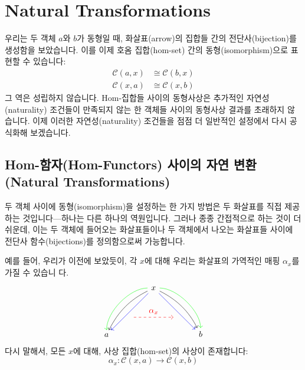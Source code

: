 \documentclass[DaoFP]{subfiles}
\begin{document}
\setcounter{chapter}{8}

\chapter{Natural Transformations}

우리는 두 객체 $a$와 $b$가 동형일 때, 화살표(arrow)의 집합들 간의 전단사(bijection)를 생성함을 보았습니다. 이를 이제 호옴 집합(hom-set) 간의 동형(isomorphism)으로 표현할 수 있습니다:
\begin{align*}
\mathcal{C}(a, x) &\cong \mathcal{C}(b, x) \\
\mathcal{C}(x, a) &\cong \mathcal{C}(x, b)
\end{align*}
그 역은 성립하지 않습니다. Hom-집합들 사이의 동형사상은 추가적인 자연성(naturality) 조건들이 만족되지 않는 한 객체들 사이의 동형사상 결과를 초래하지 않습니다. 이제 이러한 자연성(naturality) 조건들을 점점 더 일반적인 설정에서 다시 공식화해 보겠습니다.

\section{Hom-함자(Hom-Functors) 사이의 자연 변환(Natural Transformations)}

두 객체 사이에 동형(isomorphism)을 설정하는 한 가지 방법은 두 화살표를 직접 제공하는 것입니다---하나는 다른 하나의 역원입니다. 그러나 종종 간접적으로 하는 것이 더 쉬운데, 이는 두 객체에 들어오는 화살표들이나 두 객체에서 나오는 화살표들 사이에 전단사 함수(bijections)를 정의함으로써 가능합니다.

예를 들어, 우리가 이전에 보았듯이, 각 $x$에 대해 우리는 화살표의 가역적인 매핑 $\alpha_x$를 가질 수 있습니 다.
\[
 \begin{tikzcd}
 \node(x) at (0, 2) {x};
 \node(a) at (-2, 0) {a};
 \node(b) at (2, 0) {b};
 \node(c1) at (-1, 1.5) {};
 \node(c2) at (-1.5, 1) {};
 \node(c3) at (-1, 2) {};
 \node(c4) at (-2, 1) {};
 \node(d1) at (1, 1.5) {};
 \node(d2) at (1.5, 1) {};
 \node(d3) at (1, 2) {};
 \node(d4) at (2, 1) {};
\node (aa) at (-1, 0.75) {};
 \node (bb) at (1, 0.75) {};
 \draw[->] (x) .. controls (c1)  and (c2) .. (a); %
 \draw[->, green] (x) .. controls (c3)  and (c4) .. (a); %
 \draw[->, blue] (x) -- (a); 
  \draw[->] (x) .. controls (d1)  and (d2) .. (b); %
 \draw[->, green] (x) .. controls (d3)  and (d4) .. (b); %
 \draw[->, blue] (x) -- (b); 
 \draw[->, red, dashed] (aa) -- node[above]{\alpha_x} (bb);
 \end{tikzcd}
\]
다시 말해서, 모든 $x$에 대해, 사상 집합(hom-set)의 사상이 존재합니다:
\[ \alpha_x \colon \mathcal{C}(x, a) \to \mathcal{C}(x, b) \]
\end{document}
